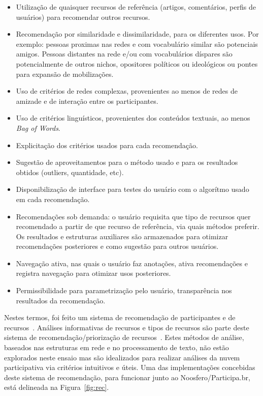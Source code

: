 \documentclass[a4paper, 11pt]{article} %
\begin{document}
\begin{itemize}
    \item Utilização de quaisquer recursos de referência (artigos, comentários, perfis de usuários) para recomendar outros recursos.
    \item Recomendação por similaridade e dissimilaridade, para os diferentes usos. Por exemplo: pessoas proximas nas redes e com vocabulário similar são potenciais amigos. Pessoas distantes na rede e/ou com vocabulários díspares são potencialmente de outros nichos, opositores políticos ou ideológicos ou pontes para expansão de mobilizações.
    \item Uso de critérios de redes complexas, provenientes ao menos de redes de amizade e de interação entre os participantes.
    \item Uso de critérios linguísticos, provenientes dos conteúdos textuais, ao menos \emph{Bag of Words}.
    \item Explicitação dos critérios usados para cada recomendação.
    \item Sugestão de aproveitamentos para o método usado e para os resultados obtidos (outliers, quantidade, etc).
    \item Disponibilização de interface para testes do usuário com o algorítmo usado em cada recomendação.
    \item Recomendações sob demanda: o usuário requisita que tipo de recursos quer recomendado a partir de que recurso de referência, via quais métodos preferir. Os resultados e estruturas auxiliares são armazenados para otimizar recomendações posteriores e como sugestão para outros usuários.
    \item Navegação ativa, nas quais o usuário faz anotações, ativa recomendações e registra navegação para otimizar usos posteriores.
    \item Permissibilidade para parametrização pelo usuário, transparência nos resultados da recomendação.
\end{itemize}


Nestes termos, foi feito um sistema de recomendação de participantes e de recursos~\cite{pnud4}. Análises informativas de recursos e tipos de recursos são parte deste sistema de recomendação/priorização de recursos~\cite{pnud3}. Estes métodos de análise, baseados nas estruturas em rede e no processamento de texto, não estão explorados neste ensaio mas são idealizados para realizar análises da nuvem participativa via critérios intuitivos e úteis.
 Uma das implementações concebidas deste sistema de recomendação, para funcionar junto ao Noosfero/Participa.br, está delineada na Figura~\ref{fig:rec}.
\end{document}
